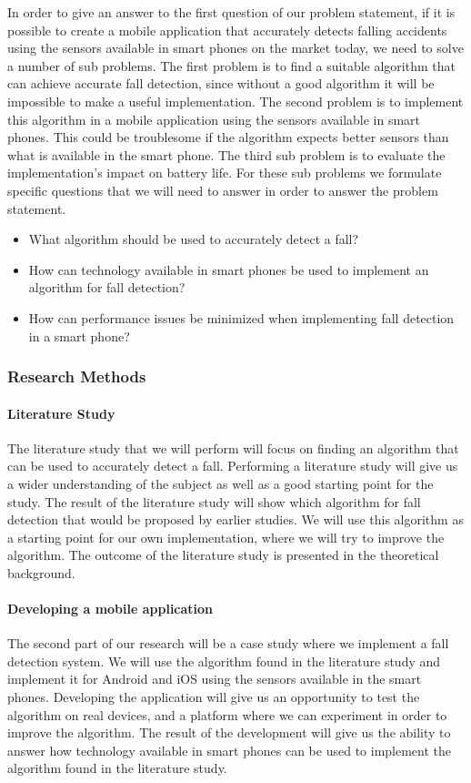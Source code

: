 \documentclass[12pt, a4paper, onecolumn]{article}
\begin{document}
In order to give an answer to the first question of our problem statement, if it is possible to create a mobile application that accurately detects falling accidents using the sensors available in smart phones on the market today, we need to solve a number of sub problems. The first problem is to find a suitable algorithm that can achieve accurate fall detection, since without a good algorithm it will be impossible to make a useful implementation. The second problem is to implement this algorithm in a mobile application using the sensors available in smart phones. This could be troublesome if the algorithm expects better sensors than what is available in the smart phone. The third sub problem is to evaluate the implementation's impact on battery life. For these sub problems we formulate specific questions that we will need to answer in order to answer the problem statement.

\begin{itemize}
	\item What algorithm should be used to accurately detect a fall?
	\item How can technology available in smart phones be used to implement an algorithm for fall detection?
	\item How can performance issues be minimized when implementing fall detection in a smart phone?
\end{itemize}

\subsubsection{Research Methods}

\paragraph{Literature Study}

The literature study that we will perform will focus on finding an algorithm that can be used to accurately detect a fall. Performing a literature study will give us a wider understanding of the subject as well as a good starting point for the study. The result of the literature study will show which algorithm for fall detection that would be proposed by earlier studies. We will use this algorithm as a starting point for our own implementation, where we will try to improve the algorithm. The outcome of the literature study is presented in the theoretical background.

\paragraph{Developing a mobile application}
The second part of our research will be a case study where we implement a fall detection system. We will use the algorithm found in the literature study and implement it for Android and iOS using the sensors available in the smart phones. Developing the application will give us an opportunity to test the algorithm on real devices, and a platform where we can experiment in order to improve the algorithm. The result of the development will give us the ability to answer how technology available in smart phones can be used to implement the algorithm found in the literature study.
\end{document}
